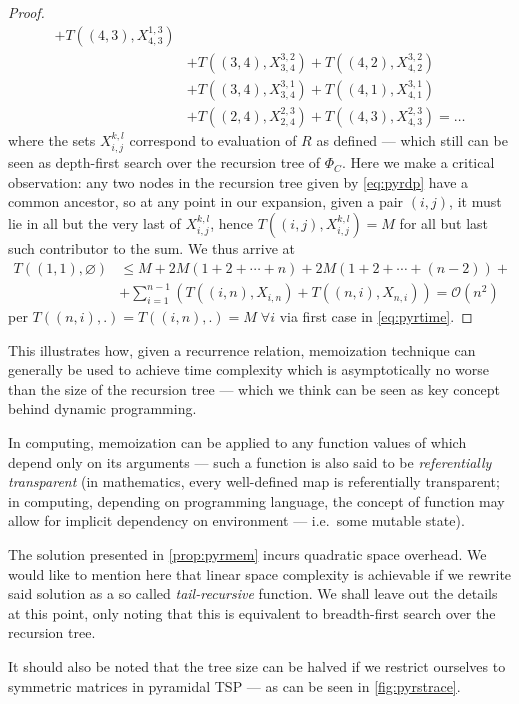 \documentclass[index=totoc,bibliography=totoc]{scrartcl}
\newcommand{\annotation}[1]{\marginpar{\small\itshape\color{green}#1}}
\numberwithin{equation}{section}
\numberwithin{figure}{section}
\numberwithin{table}{section}
\let\defstyle\itshape
\begin{document}
\begin{proof}
\begin{align*}
         + T\left((4,3),X_{4,3}^{1,3}\right)
    \\ & + T\left((3,4),X_{3,4}^{3,2}\right)
         + T\left((4,2),X_{4,2}^{3,2}\right)
    \\ & + T\left((3,4),X_{3,4}^{3,1}\right)
         + T\left((4,1),X_{4,1}^{3,1}\right)
    \\ & + T\left((2,4),X_{2,4}^{2,3}\right)
         + T\left((4,3),X_{4,3}^{2,3}\right) = \ldots
  \end{align*}
  where the sets $X_{i,j}^{k,l}$ correspond to evaluation of $R$ as defined ---
  which still can be seen as depth-first search over the recursion tree of $\Phi_C$.
  Here we make a critical observation:
  any two nodes in the recursion tree given by \cref{eq:pyrdp} have a common ancestor,
  so at any point in our expansion,
  given a pair $(i,j)$, it must lie in all but the very last of $X_{i,j}^{k,l}$,
  hence $T\left((i,j),X_{i,j}^{k,l}\right) = M$ for all but last such contributor to the sum.
  We thus arrive at
  \annotation{recheck}
  \begin{align*}
    T\left((1,1),\varnothing\right) & \leq
    M + 2M \left(1 + 2 + \cdots + n\right) +
        2M \left(1 + 2 + \cdots + (n-2)\right) +
    \\
    & + \sum_{i=1}^{n-1} \left(
        T\left((i,n),X_{i,n}\right)
      + T\left((n,i),X_{n,i}\right)
    \right)
    = \mathcal{O}\left(n^2\right)
  \end{align*}
  per $T\left((n,i),.\right) = T\left((i,n),.\right) = M \; \forall i$
  via first case in \eqref{eq:pyrtime}.
\end{proof}

This illustrates how, given a recurrence relation, memoization technique
can generally be used to achieve time complexity which is asymptotically no
worse than the size of the recursion tree --- which we think can be seen as
key concept behind dynamic programming.

In computing, memoization can be applied to any function values of which
depend only on its arguments --- such a function is also said to be
{\defstyle referentially transparent} (in mathematics, every well-defined
map is referentially transparent; in computing, depending on programming
language, the concept of function may allow for implicit dependency on
environment --- i.e.\ some mutable state).

\begin{remark}
  The solution presented in \cref{prop:pyrmem} incurs quadratic space
  overhead.  We would like to mention here that linear space complexity is
  achievable if we rewrite said solution as a so called {\defstyle
    tail-recursive} function.  We shall leave out the details at this
  point, only noting that this is equivalent to breadth-first search over
  the recursion tree.

  It should also be noted that the tree size can be halved if we
  restrict ourselves to symmetric matrices in pyramidal TSP ---
  as can be seen in \cref{fig:pyrstrace}.
\end{remark}
\end{document}
